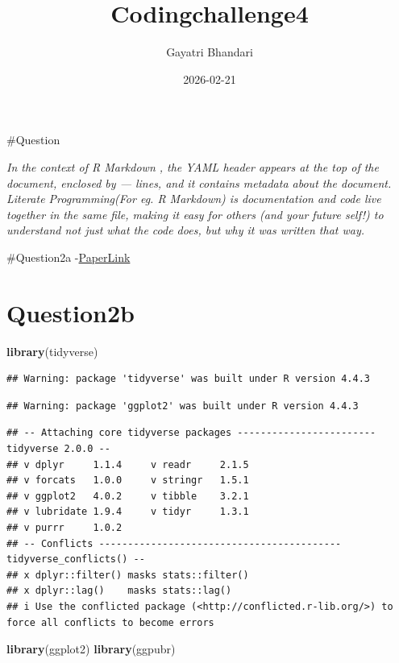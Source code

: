 \documentclass[
]{article}
\title{Codingchallenge4}
\author{Gayatri Bhandari}
\date{2026-02-21}
\newenvironment{Shaded}{\begin{snugshade}}{\end{snugshade}}
\newcommand{\FunctionTok}[1]{\textcolor[rgb]{0.13,0.29,0.53}{\textbf{#1}}}
\newcommand{\NormalTok}[1]{#1}
\begin{document}
\maketitle

{
\setcounter{tocdepth}{2}
\tableofcontents
}
\#Question

\emph{In the context of R Markdown , the YAML header appears at the top
of the document, enclosed by --- lines, and it contains metadata about
the document.} \emph{Literate Programming(For eg. R Markdown) is
documentation and code live together in the same file, making it easy
for others (and your future self!) to understand not just what the code
does, but why it was written that way.}

\#Question2a
-\href{https://apsjournals.apsnet.org/doi/10.1094/PDIS-06-21-1253-RE}{PaperLink}

\section{Question2b}\label{question2b}

\begin{Shaded}
\begin{Highlighting}[]
\FunctionTok{library}\NormalTok{(tidyverse)}
\end{Highlighting}
\end{Shaded}

\begin{verbatim}
## Warning: package 'tidyverse' was built under R version 4.4.3
\end{verbatim}

\begin{verbatim}
## Warning: package 'ggplot2' was built under R version 4.4.3
\end{verbatim}

\begin{verbatim}
## -- Attaching core tidyverse packages ------------------------ tidyverse 2.0.0 --
## v dplyr     1.1.4     v readr     2.1.5
## v forcats   1.0.0     v stringr   1.5.1
## v ggplot2   4.0.2     v tibble    3.2.1
## v lubridate 1.9.4     v tidyr     1.3.1
## v purrr     1.0.2     
## -- Conflicts ------------------------------------------ tidyverse_conflicts() --
## x dplyr::filter() masks stats::filter()
## x dplyr::lag()    masks stats::lag()
## i Use the conflicted package (<http://conflicted.r-lib.org/>) to force all conflicts to become errors
\end{verbatim}

\begin{Shaded}
\begin{Highlighting}[]
\FunctionTok{library}\NormalTok{(ggplot2)}
\FunctionTok{library}\NormalTok{(ggpubr) }
\end{Highlighting}
\end{Shaded}
\end{document}
